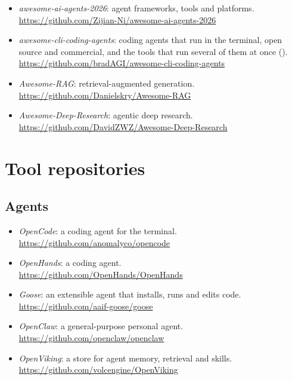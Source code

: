 \begin{itemize}
  \item \emph{awesome-ai-agents-2026}: agent frameworks, tools and platforms.\\
    \url{https://github.com/Zijian-Ni/awesome-ai-agents-2026}
  \item \emph{awesome-cli-coding-agents}: coding agents that run in the
    terminal, open source and commercial, and the tools that run several of
    them at once ().\\
    \url{https://github.com/bradAGI/awesome-cli-coding-agents}
  \item \emph{Awesome-RAG}: retrieval-augmented generation.\\
    \url{https://github.com/Danielskry/Awesome-RAG}
  \item \emph{Awesome-Deep-Research}: agentic deep research.\\
    \url{https://github.com/DavidZWZ/Awesome-Deep-Research}
\end{itemize}

\section{Tool repositories}

\subsection{Agents}

\begin{itemize}
  \item \emph{OpenCode}: a coding agent for the terminal.\\
    \url{https://github.com/anomalyco/opencode}
  \item \emph{OpenHands}: a coding agent.\\
    \url{https://github.com/OpenHands/OpenHands}
  \item \emph{Goose}: an extensible agent that installs, runs and edits code.\\
    \url{https://github.com/aaif-goose/goose}
  \item \emph{OpenClaw}: a general-purpose personal agent.\\
    \url{https://github.com/openclaw/openclaw}
  \item \emph{OpenViking}: a store for agent memory, retrieval and skills.\\
    \url{https://github.com/volcengine/OpenViking}
\end{itemize}

